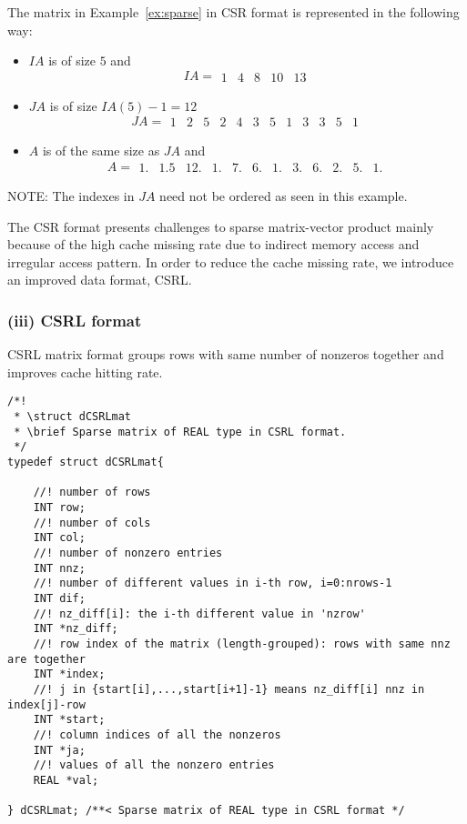 \documentclass[11pt]{memoir}
\begin{document}
The matrix in Example~\ref{ex:sparse} in CSR format is represented in the following way:
\begin{itemize}
\item $IA$ is of size $5$ and 
$$IA = 
\begin{array}{||c|c|c|c|c||}1&4&8&10&13\end{array}
$$
\item $JA$ is of size $IA(5)-1=12$  
$$JA = 
\begin{array}{||c|c|c||c|c|c|c||c|c||c|c|c||}
1&2&5&2&4&3&5&1&3&3&5&1
\end{array}
$$
\item $A$ is of the same size as $JA$ and   
$$A = 
\begin{array}{||c|c|c||c|c|c|c||c|c||c|c|c||}
1.&1.5&12.&1.&7.&6.&1.&3.&6.&2.&5.&1.
\end{array}
$$
\end{itemize}

\begin{snugshade}\noindent
NOTE: The indexes in $JA$ need not be ordered as seen in this example.
\end{snugshade}

The CSR format presents challenges to sparse matrix-vector product mainly because of the high cache missing rate due to indirect memory access and irregular access pattern. In order to reduce the cache missing rate, we introduce an improved data format, CSRL.

\subsubsection*{(iii) CSRL format}

CSRL matrix format groups rows with same number of nonzeros together and improves cache hitting rate. 
\begin{lstlisting}
/*!
 * \struct dCSRLmat
 * \brief Sparse matrix of REAL type in CSRL format.
 */
typedef struct dCSRLmat{
    
	//! number of rows	
	INT row;
	//! number of cols
	INT col;
	//! number of nonzero entries
	INT nnz;
	//! number of different values in i-th row, i=0:nrows-1
	INT dif;
	//! nz_diff[i]: the i-th different value in 'nzrow'
	INT *nz_diff;
	//! row index of the matrix (length-grouped): rows with same nnz are together
	INT *index;
	//! j in {start[i],...,start[i+1]-1} means nz_diff[i] nnz in index[j]-row	
	INT *start;
	//! column indices of all the nonzeros
	INT *ja;
	//! values of all the nonzero entries
	REAL *val;
    
} dCSRLmat; /**< Sparse matrix of REAL type in CSRL format */
\end{lstlisting}
\end{document}
